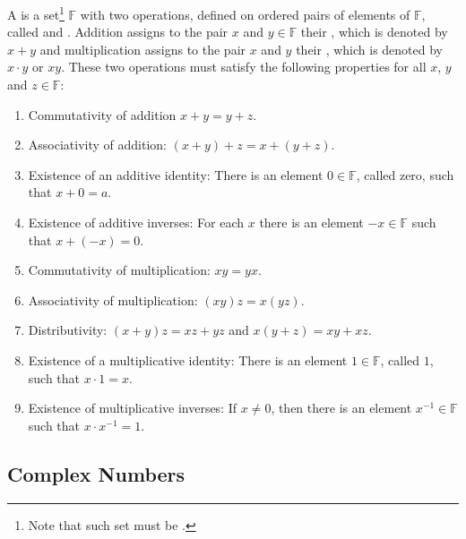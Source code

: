 \documentclass[11pt,fleqn]{book} %
\begin{document}
\setcounter{chapter}{5}
\setcounter{definitionT}{3}
\begin{definition}[Field]
    A  is a set\footnote{Note that such set must be .} $\mathbb{F}$ with two operations, defined on ordered pairs of elements of $\mathbb{F}$, called  and . Addition assigns to the pair $x$ and $y \in \mathbb{F}$ their , which is denoted by $x + y$ and multiplication assigns to the pair $x$ and $y$ their , which is denoted by $x \cdot y$ or $xy$. These two operations must satisfy the following properties for all $x$, $y$ and $z \in \mathbb{F}$:

    \begin{enumerate}[label=(\roman*)]
        \item Commutativity of addition $x + y = y + z$.

        \item Associativity of addition: $(x + y) + z = x + (y + z)$.

        \item Existence of an additive identity: There is an element $0 \in \mathbb{F}$, called zero, such that $x + 0 = a$.

        \item Existence of additive inverses: For each $x$ there is an element $-x \in \mathbb{F}$ such that $x + (-x) = 0$.

        \item Commutativity of multiplication: $xy  = yx$.

        \item Associativity of multiplication: $(xy)z = x(yz)$.

        \item Distributivity: $(x + y)z = xz + yz$ and $x(y + z) = xy + xz$.

        \item Existence of a multiplicative identity: There is an element $1 \in \mathbb{F}$, called $1$, such that $x \cdot 1  = x$.

        \item Existence of multiplicative inverses: If $x \neq 0$, then there is an element $x^{-1} \in \mathbb{F}$ such that $x \cdot x^{-1}  = 1$.
    \end{enumerate}
\end{definition}
\setcounter{chapter}{1}

\subsection{Complex Numbers}
\end{document}
